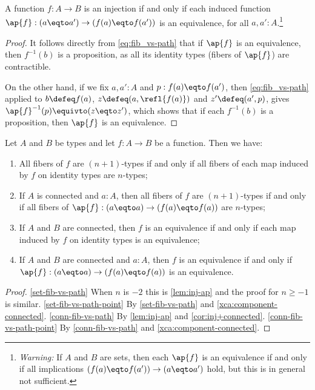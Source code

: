 \begin{lemma}\label{lem:inj-ap}
  A function $f:A\to B$ is an injection if and only if
  each induced function
  $\ap{f}: (a \eqto a') \to (f(a) \eqto f(a'))$ is an equivalence,
  for all $a,a':A$.\footnote{%
    \emph{Warning:}
    If $A$ and $B$ are sets, then each $\ap{f}$ is an equivalence
    if and only if all implications $(f(a) \eqto f(a')) \to (a \eqto a')$
    hold, but this is in general not sufficient.}
\end{lemma}

\begin{proof}
  It follows directly from \eqref{eq:fib_vs-path}
  that if $\ap{f}$ is an equivalence,
  then $f^{-1}(b)$ is a proposition,
  as all its identity types (fibers of $\ap{f}$) are contractible.

  On the other hand, if we fix $a,a':A$ and $p:f(a) \eqto f(a')$,
  then \eqref{eq:fib_vs-path} applied to $b \defeq f(a)$,
  $z \defeq (a,\refl{f(a)})$ and
  $z' \defeq (a',p)$,
  gives $\ap{f}^{-1}(p) \equivto (z \eqto z')$,
  which shows that if each $f^{-1}(b)$ is a proposition,
  then $\ap{f}$ is an equivalence.
\end{proof}


\begin{corollary}\label{cor:fib-vs-path}
Let $A$ and $B$ be types and let $f:A\to B$ be a function. Then we have:
\begin{enumerate}
\item\label{set-fib-vs-path}
All fibers of $f$ are $(n{+}1)$-types if and only if all fibers of
each map induced by $f$ on identity types are $n$-types;
\item\label{set-fib-vs-path-point}
If $A$ is connected and $a:A$, then
all fibers of $f$ are $(n{+}1)$-types if and only if all fibers of
$\ap{f}: (a \eqto a) \to (f(a) \eqto f(a))$ are $n$-types;
\item\label{conn-fib-vs-path}
If $A$ and $B$ are connected, then $f$ is an equivalence
if and only if each map induced by $f$ on identity types is an equivalence;
\item\label{conn-fib-vs-path-point}
If $A$ and $B$ are connected and $a:A$, then $f$ is an equivalence
if and only if $\ap{f}: (a \eqto a) \to (f(a) \eqto f(a))$ is an equivalence.
\end{enumerate}
\end{corollary}
\begin{proof}
\ref{set-fib-vs-path} When $n$ is $-2$ this is \cref{lem:inj-ap}
and the proof for $n\geq -1$ is similar.
\ref{set-fib-vs-path-point} By \ref{set-fib-vs-path} and \cref{xca:component-connected}.
\ref{conn-fib-vs-path} By \cref{lem:inj-ap} and \cref{cor:inj+connected}.
\ref{conn-fib-vs-path-point} By \ref{conn-fib-vs-path} and \cref{xca:component-connected}.
\end{proof}

